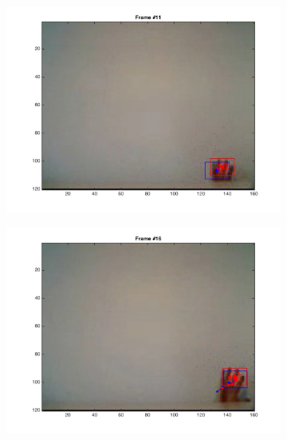 \documentclass{ethz_report}
\begin{document}
\begin{figure}[H]
    \centering
    \begin{subfigure}[b]{.25\textwidth}
        \centering
        \includegraphics[width=1\linewidth]{images/video1_1}
    \end{subfigure}%
    \begin{subfigure}[b]{.25\textwidth}
        \centering
        \includegraphics[width=1\linewidth]{images/video1_6}
    \end{subfigure}%
    \begin{subfigure}[b]{.25\textwidth}
        \centering

\end{subfigure}
\end{figure}
\end{document}

